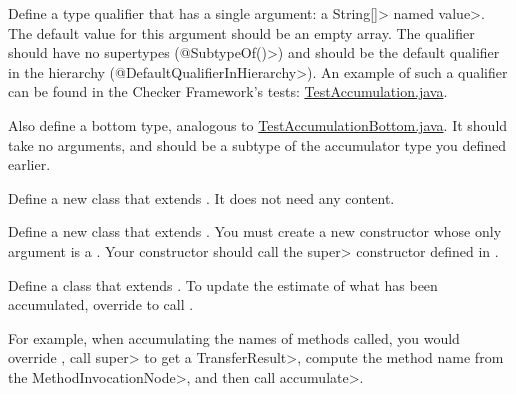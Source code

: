 Define a type qualifier that has a single argument: a \<String[]> named \<value>.
The default value for this argument should be an empty array. The
qualifier should have no supertypes (\<@SubtypeOf({})>) and should
be the default qualifier in the hierarchy (\<@DefaultQualifierInHierarchy>).
An example of such a qualifier can be found in the Checker Framework's tests:
\href{https://github.com/typetools/checker-framework/blob/master/framework/src/test/java/testaccumulation/qual/TestAccumulation.java}{TestAccumulation.java}.

Also define a bottom type, analogous to
\href{https://github.com/typetools/checker-framework/blob/master/framework/src/test/java/testaccumulation/qual/TestAccumulationBottom.java}{TestAccumulationBottom.java}.
It should take no arguments, and should be a subtype of the accumulator type you defined earlier.


Define a new class that extends .
It does not need any content.

Define a new class that extends .
You must create a new constructor whose only argument is a .
Your constructor should call the \<super> constructor defined in
.



Define a class that extends .
To update the estimate of what has been accumulated, override
 to call
.

For example, when accumulating the names of methods called, you would override
,
call \<super> to get a \<TransferResult>, compute the method name from the \<MethodInvocationNode>,
and then call \<accumulate>.
